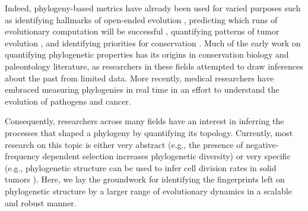 Indeed, phylogeny-based metrics have already been used for varied purposes such as identifying hallmarks of open-ended evolution \citep{dolsonMODESToolboxMeasurements2019}, predicting which runs of evolutionary computation will be successful \citep{hernandezWhatCanPhylogenetic2022a,shahbandeganUntanglingPhylogeneticDiversity2022a}, quantifying patterns of tumor evolution \citep{scottInferringTumorProliferative2020,lewinsohnStatedependentEvolutionaryModels2023}, and identifying priorities for conservation \citep{forestPreservingEvolutionaryPotential2007}.
Much of the early work on quantifying phylogenetic properties has its origins in conservation biology and paleontology literature, as researchers in these fields attempted to draw inferences about the past from limited data.
More recently, medical researchers have embraced measuring phylogenies in real time in an effort to understand the evolution of pathogens and cancer.




Consequently, researchers across many fields have an interest in inferring the processes that shaped a phylogeny by quantifying its topology.
Currently, most research on this topic is either very abstract (e.g., the presence of negative-frequency dependent selection increases phylogenetic diversity) or very specific (e.g., phylogenetic structure can be used to infer cell division rates in solid tumors \citep{lewinsohnStatedependentEvolutionaryModels2023}).
Here, we lay the groundwork for identifying the fingerprints left on phylogenetic structure by a larger range of evolutionary dynamics in a scalable and robust manner.


